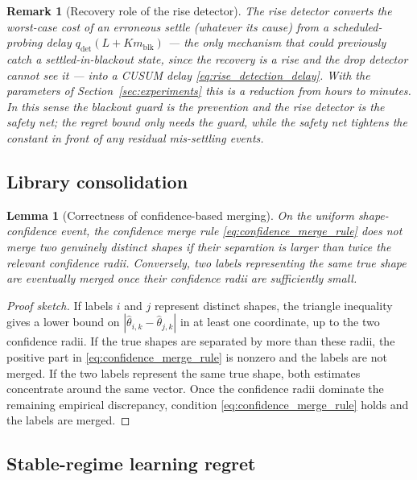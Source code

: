 \documentclass[11pt]{article}
\newtheorem{lemma}{Lemma}
\newtheorem{remark}{Remark}
\newcommand{\abs}[1]{\left\lvert #1 \right\rvert}
\begin{document}
\begin{remark}[Recovery role of the rise detector]
\label{rem:recovery}
The rise detector converts the worst-case cost of an erroneous settle (whatever its cause) from a scheduled-probing delay $q_{\mathrm{det}}(L+Km_{\mathrm{blk}})$ --- the only mechanism that could previously catch a settled-in-blackout state, since the recovery is a \emph{rise} and the drop detector cannot see it --- into a CUSUM delay \eqref{eq:rise_detection_delay}. With the parameters of Section~\ref{sec:experiments} this is a reduction from hours to minutes. In this sense the blackout guard is the prevention and the rise detector is the safety net; the regret bound only needs the guard, while the safety net tightens the constant in front of any residual mis-settling events.
\end{remark}

\subsection{Library consolidation}
\label{subsec:merge_proof}

\begin{lemma}[Correctness of confidence-based merging]
\label{lem:merge_correctness}
On the uniform shape-confidence event, the confidence merge rule \eqref{eq:confidence_merge_rule} does not merge two genuinely distinct shapes if their separation is larger than twice the relevant confidence radii. Conversely, two labels representing the same true shape are eventually merged once their confidence radii are sufficiently small.
\end{lemma}

\begin{proof}[Proof sketch]
If labels $i$ and $j$ represent distinct shapes, the triangle inequality gives a lower bound on $\abs{\widehat\theta_{i,k}-\widehat\theta_{j,k}}$ in at least one coordinate, up to the two confidence radii. If the true shapes are separated by more than these radii, the positive part in \eqref{eq:confidence_merge_rule} is nonzero and the labels are not merged. If the two labels represent the same true shape, both estimates concentrate around the same vector. Once the confidence radii dominate the remaining empirical discrepancy, condition \eqref{eq:confidence_merge_rule} holds and the labels are merged.
\end{proof}

\subsection{Stable-regime learning regret}
\label{subsec:stable_learning_proof}
\end{document}
